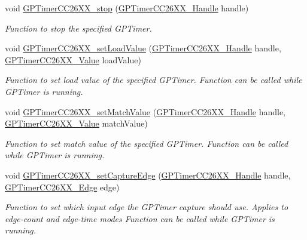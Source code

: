 \begin{DoxyCompactItemize}
void \hyperlink{_g_p_timer_c_c26_x_x_8h_aebdbd7f83c3824555e4abb7399802765}{G\+P\+Timer\+C\+C26\+X\+X\+\_\+stop} (\hyperlink{_g_p_timer_c_c26_x_x_8h_ab85403dde5940c587c57ca1a140e655a}{G\+P\+Timer\+C\+C26\+X\+X\+\_\+\+Handle} handle)
\begin{DoxyCompactList}\small\item\em Function to stop the specified G\+P\+Timer. \end{DoxyCompactList}\item 
void \hyperlink{_g_p_timer_c_c26_x_x_8h_aa365d9e1d6a1b324090510f2748db771}{G\+P\+Timer\+C\+C26\+X\+X\+\_\+set\+Load\+Value} (\hyperlink{_g_p_timer_c_c26_x_x_8h_ab85403dde5940c587c57ca1a140e655a}{G\+P\+Timer\+C\+C26\+X\+X\+\_\+\+Handle} handle, \hyperlink{_g_p_timer_c_c26_x_x_8h_ab667a2fd47273a9778f5011774fa55c0}{G\+P\+Timer\+C\+C26\+X\+X\+\_\+\+Value} load\+Value)
\begin{DoxyCompactList}\small\item\em Function to set load value of the specified G\+P\+Timer. Function can be called while G\+P\+Timer is running. \end{DoxyCompactList}\item 
void \hyperlink{_g_p_timer_c_c26_x_x_8h_a3f83bdcc8482297952f6e08ccadd0e11}{G\+P\+Timer\+C\+C26\+X\+X\+\_\+set\+Match\+Value} (\hyperlink{_g_p_timer_c_c26_x_x_8h_ab85403dde5940c587c57ca1a140e655a}{G\+P\+Timer\+C\+C26\+X\+X\+\_\+\+Handle} handle, \hyperlink{_g_p_timer_c_c26_x_x_8h_ab667a2fd47273a9778f5011774fa55c0}{G\+P\+Timer\+C\+C26\+X\+X\+\_\+\+Value} match\+Value)
\begin{DoxyCompactList}\small\item\em Function to set match value of the specified G\+P\+Timer. Function can be called while G\+P\+Timer is running. \end{DoxyCompactList}\item 
void \hyperlink{_g_p_timer_c_c26_x_x_8h_ae6a091f0962d33a7897ae61b501aedc4}{G\+P\+Timer\+C\+C26\+X\+X\+\_\+set\+Capture\+Edge} (\hyperlink{_g_p_timer_c_c26_x_x_8h_ab85403dde5940c587c57ca1a140e655a}{G\+P\+Timer\+C\+C26\+X\+X\+\_\+\+Handle} handle, \hyperlink{_g_p_timer_c_c26_x_x_8h_ac72f25419727329702ec162a2b6b9151}{G\+P\+Timer\+C\+C26\+X\+X\+\_\+\+Edge} edge)
\begin{DoxyCompactList}\small\item\em Function to set which input edge the G\+P\+Timer capture should use. Applies to edge-\/count and edge-\/time modes Function can be called while G\+P\+Timer is running. \end{DoxyCompactList}\item 

\end{DoxyCompactItemize}
